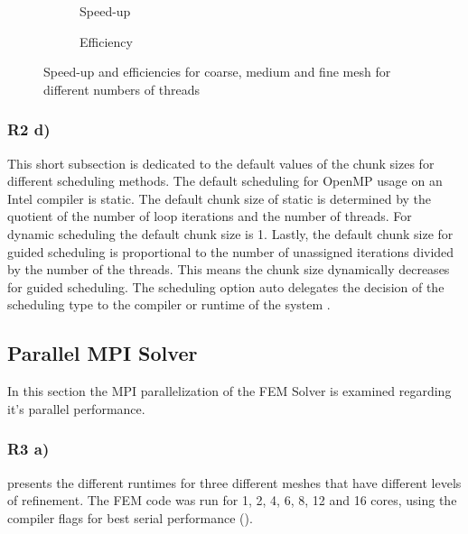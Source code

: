 \begin{figure}[h!]
	\centering
	\begin{subfigure}{0.49\textwidth}
		\centering
		\resizebox{0.5\width}{!}{}
		\caption{\label{fig::SPOpenMP} Speed-up}
	\end{subfigure}
	\hfill
	\begin{subfigure}{0.49\textwidth}
		\centering
		\resizebox{0.5\width}{!}{}
		\caption{\label{fig::EffOpenMP} Efficiency}
	\end{subfigure}
	\caption{\label{fig::EffSPOpenMP} Speed-up and efficiencies for coarse, medium and fine mesh for different numbers of threads}
\end{figure}

\subsubsection{R2 d)}
This short subsection is dedicated to the default values of the chunk sizes for different scheduling methods. The default scheduling for OpenMP usage on an Intel compiler is static. The default chunk size of static is determined by the quotient of the number of loop iterations and the number of threads. For dynamic scheduling the default chunk size is 1. Lastly, the default chunk size for guided scheduling is proportional to the number of unassigned iterations divided by the number of the threads. This means the chunk size dynamically decreases for guided scheduling. The scheduling option auto delegates the decision of the scheduling type to the compiler or runtime of the system \cite{spehOpenMPScheduling2016}.

\clearpage
\subsection{Parallel MPI Solver}

In this section the MPI parallelization of the FEM Solver is examined regarding it's parallel performance. 

\subsubsection{R3 a)}

 presents the different runtimes for three different meshes that have different levels of refinement. The FEM code was run for 1, 2, 4, 6, 8, 12 and 16 cores, using the compiler flags for best serial performance (). 

